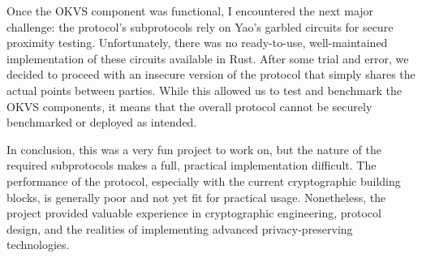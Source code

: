 Once the OKVS component was functional, I encountered the next major challenge: the protocol's subprotocols rely on Yao's garbled circuits for secure proximity testing. Unfortunately, there was no ready-to-use, well-maintained implementation of these circuits available in Rust. After some trial and error, we decided to proceed with an insecure version of the protocol that simply shares the actual points between parties. While this allowed us to test and benchmark the OKVS components, it means that the overall protocol cannot be securely benchmarked or deployed as intended.

In conclusion, this was a very fun project to work on, but the nature of the required subprotocols makes a full, practical implementation difficult. The performance of the protocol, especially with the current cryptographic building blocks, is generally poor and not yet fit for practical usage. Nonetheless, the project provided valuable experience in cryptographic engineering, protocol design, and the realities of implementing advanced privacy-preserving technologies.
